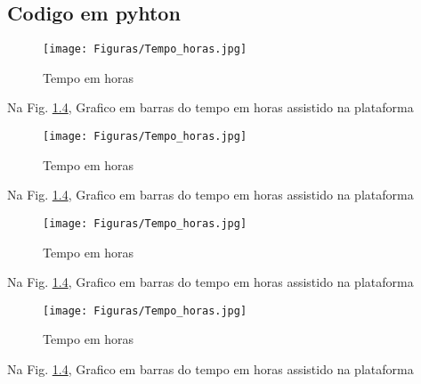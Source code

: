 
\begin{apendicesenv}
\partapendices  %

\chapter{Codigo em pyhton}

\begin{figure}[h]
\caption{Tempo em horas}
 
\centering %
\texttt{[image: Figuras/Tempo\_horas.jpg]} %
\label{figura:qualquernome}
\end{figure}
Na Fig. \ref{figura:qualquernome}, Grafico em barras do tempo em horas assistido na plataforma
\begin{figure}[h]
\caption{Tempo em horas}
 
\centering %
\texttt{[image: Figuras/Tempo\_horas.jpg]} %
\label{figura:qualquernome}
\end{figure}
Na Fig. \ref{figura:qualquernome}, Grafico em barras do tempo em horas assistido na plataforma
\begin{figure}[h]
\caption{Tempo em horas}
 
\centering %
\texttt{[image: Figuras/Tempo\_horas.jpg]} %
\label{figura:qualquernome}
\end{figure}
Na Fig. \ref{figura:qualquernome}, Grafico em barras do tempo em horas assistido na plataforma
\begin{figure}[h]
\caption{Tempo em horas}
 
\centering %
\texttt{[image: Figuras/Tempo\_horas.jpg]} %
\label{figura:qualquernome}
\end{figure}
Na Fig. \ref{figura:qualquernome}, Grafico em barras do tempo em horas assistido na plataforma

\end{apendicesenv}
